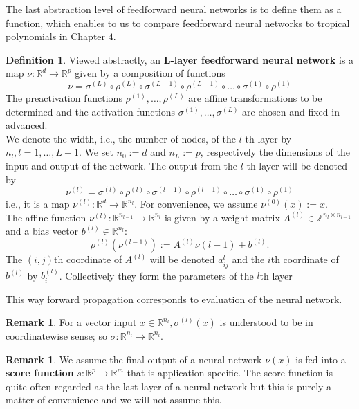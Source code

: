 \documentclass{article}
\theoremstyle{definition}
\newtheorem{definition}[theorem]{Definition}
\newtheorem{remark}[theorem]{Remark}
\begin{document}
The last abstraction level of feedforward neural networks is to define them as a function, which enables to us to compare feedforward neural networks to tropical polynomials in Chapter $4$.

\begin{definition}\cite{zhang2018tropical}
Viewed abstractly, an \textbf{L-layer feedforward neural network} is a map $\nu : \mathbb{R}^{d} \to \mathbb{R}^{p}$ given by a composition of functions
$$ \nu = \sigma^{(L)} \circ \rho^{(L)} \circ \sigma^{(L-1)} \circ \rho^{(L-1)} \circ \dots \circ \sigma^{(1)} \circ \rho^{(1)}$$
The preactivation functions $\rho^{(1)}, \dots , \rho^{(L)}$ are affine transformations to be determined and the activation functions $\sigma^{(1)}, \dots , \sigma^{(L)}$ are chosen and fixed in advanced. \\
We denote the width, i.e., the number of nodes, of the $l$-th
layer by $n_l, l = 1, \dots , L-1$. We set $n_0 := d$ and $n_L := p$, respectively the dimensions of the input and output of the network. The output from the $l$-th layer will be denoted by
$$\nu^{(l)} = \sigma^{(l)} \circ \rho^{(l)} \circ \sigma^{(l-1)} \circ \rho^{(l-1)} \circ \dots \circ \sigma^{(1)} \circ \rho^{(1)}$$
i.e., it is a map $\nu^{(l)} : \mathbb{R}^{d} \to \mathbb{R}^{n_l}$. For convenience, we assume $\nu^{(0)}(x) := x$. \\
The affine function $\nu^{(l)} : \mathbb{R}^{n_{l-1}} \to \mathbb{R}^{n_{l}}$ is given by a weight matrix $A^{(l)} \in \mathbb{Z}^{n_l \times n_{l-1}} $ and a bias vector $b^{(l)} \in \mathbb{R}^{n_l}$:
$$ \rho^{(l)}(\nu^{(l-1)}) := A^{(l)} \nu{(l-1)} + b^{(l)}. $$
The $(i, j)$th coordinate of $A^{(l)}$ will be denoted $a^{l}_{ij}$ and the $i$th coordinate of $b^{(l)}$ by $b^{(l)}_{i}$. Collectively they form the parameters of the $l$th layer
\end{definition}

This way forward propagation corresponds to evaluation of the neural network.

\begin{remark}\cite{zhang2018tropical}
For a vector input $x \in \mathbb{R}^{n_l}, \sigma^{(l)}(x)$ is understood to be in coordinatewise sense; so $\sigma : \mathbb{R}^{n_l} \to \mathbb{R}^{n_l}$.
\end{remark}
\begin{remark}\cite{zhang2018tropical}
\label{rem:score_fkt}
We assume the final output of a neural network $\nu(x)$ is fed into a \textbf{score function} $s : \mathbb{R}^{p} \to \mathbb{R}^{m}$ that is application specific. The score function is quite often regarded as the last layer of a neural network but this is purely a matter of convenience and we will not assume this.
\end{remark}
\end{document}
